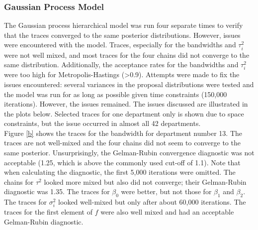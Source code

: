 \documentclass[paper=a4, fontsize=11pt]{scrartcl}
\begin{document}
\subsubsection{Gaussian Process Model}
The Gaussian process hierarchical model was run four separate times to verify that the traces converged to the same posterior distributions. However, issues were encountered with the model. Traces, especially for the bandwidths and $\tau^2_i$ were not well mixed, and most traces for the four chains did not converge to the same distribution. Additionally, the acceptance rates for the bandwidths and $\tau^2_i$ were too high for Metropolis-Hastings (>0.9). Attempts were made to fix the issues encountered: several variances in the proposal distributions were tested and the model was run for as long as possible given time constraints (150,000 iterations). However, the issues remained. The issues discussed are illustrated in the plots below. Selected traces for one department only is shown due to space constraints, but the issue occurred in almost all 42 departments.\\

Figure \ref{b} shows the traces for the bandwidth for department number 13. The traces are not well-mixed and the four chains did not seem to converge to the same posterior. Unsurprisingly, the Gelman-Rubin convergence diagnostic was not acceptable (1.25, which is above the commonly used cut-off of 1.1). Note that when calculating the diagnostic, the first 5,000 iterations were omitted. The chains for  $\tau^2$ looked more mixed but also did not converge; their Gelman-Rubin diagnostic was 1.35. The traces for $\beta_0$ were better, but not those for $\beta_1$ and $\beta_2$. The traces for $\sigma_i^2$ looked well-mixed but only after about 60,000 iterations. The traces for the first element of $f$ were also well mixed and had an acceptable Gelman-Rubin diagnostic.
\end{document}
